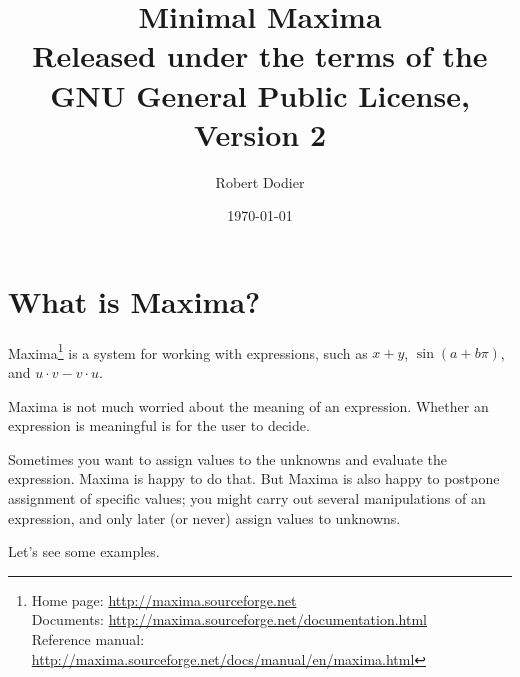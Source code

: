 \documentclass[12pt,leqno]{article}
\title{Minimal Maxima\\
{\small Released under the terms of the GNU General Public License, Version 2}}
\author{Robert Dodier}
\date{\today}
\begin{document}
\maketitle

\section{What is Maxima?}

Maxima\footnote
{Home page: \url{http://maxima.sourceforge.net} \\
Documents: \url{http://maxima.sourceforge.net/documentation.html} \\
Reference manual: \url{http://maxima.sourceforge.net/docs/manual/en/maxima.html}}
is a system for working with expressions,
such as $x + y$, $\sin (a + b \pi)$, and $u \cdot v - v \cdot u$.

Maxima is not much worried about the meaning of an expression.
Whether an expression is meaningful is for the user to decide.

Sometimes you want to assign values to the unknowns
and evaluate the expression.
Maxima is happy to do that.
But Maxima is also happy to postpone assignment of specific values;
you might carry out several manipulations of an expression,
and only later (or never) assign values to unknowns.

Let's see some examples.
\end{document}
